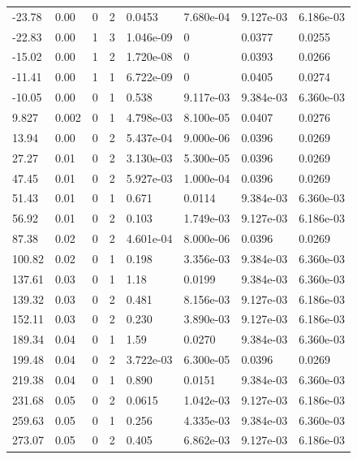 \documentclass[preview]{standalone}
\begin{document}
{{\begin{tabular}{L{1.2cm}C{1.2cm} C{0.3cm}C{0.5cm} C{1.4cm}C{1.4cm} C{1.4cm}C{1.4cm}}
  -23.78  &  0.00  & 0     &  2 &  0.0453  & 7.680e-04  & 9.127e-03 &  6.186e-03   \\ 
  -22.83  &  0.00  & 1     &  3 &  1.046e-09  & 0  & 0.0377 &  0.0255   \\ 
  -15.02  &  0.00  & 1     &  2 &  1.720e-08  & 0  & 0.0393 &  0.0266   \\ 
  -11.41  &  0.00  & 1     &  1 &  6.722e-09  & 0  & 0.0405 &  0.0274   \\ 
  -10.05  &  0.00  & 0     &  1 &  0.538  & 9.117e-03  & 9.384e-03 &  6.360e-03   \\ 
  9.827  &  0.002  & 0     &  1 &  4.798e-03  & 8.100e-05  & 0.0407 &  0.0276   \\ 
  13.94  &  0.00  & 0     &  2 &  5.437e-04  & 9.000e-06  & 0.0396 &  0.0269   \\ 
  27.27  &  0.01  & 0     &  2 &  3.130e-03  & 5.300e-05  & 0.0396 &  0.0269   \\ 
  47.45  &  0.01  & 0     &  2 &  5.927e-03  & 1.000e-04  & 0.0396 &  0.0269   \\ 
  51.43  &  0.01  & 0     &  1 &  0.671  & 0.0114  & 9.384e-03 &  6.360e-03   \\ 
  56.92  &  0.01  & 0     &  2 &  0.103  & 1.749e-03  & 9.127e-03 &  6.186e-03   \\ 
  87.38  &  0.02  & 0     &  2 &  4.601e-04  & 8.000e-06  & 0.0396 &  0.0269   \\ 
  100.82  &  0.02  & 0     &  1 &  0.198  & 3.356e-03  & 9.384e-03 &  6.360e-03   \\ 
  137.61  &  0.03  & 0     &  1 &  1.18  & 0.0199  & 9.384e-03 &  6.360e-03   \\ 
  139.32  &  0.03  & 0     &  2 &  0.481  & 8.156e-03  & 9.127e-03 &  6.186e-03   \\ 
  152.11  &  0.03  & 0     &  2 &  0.230  & 3.890e-03  & 9.127e-03 &  6.186e-03   \\ 
  189.34  &  0.04  & 0     &  1 &  1.59  & 0.0270  & 9.384e-03 &  6.360e-03   \\ 
  199.48  &  0.04  & 0     &  2 &  3.722e-03  & 6.300e-05  & 0.0396 &  0.0269   \\ 
  219.38  &  0.04  & 0     &  1 &  0.890  & 0.0151  & 9.384e-03 &  6.360e-03   \\ 
  231.68  &  0.05  & 0     &  2 &  0.0615  & 1.042e-03  & 9.127e-03 &  6.186e-03   \\ 
  259.63  &  0.05  & 0     &  1 &  0.256  & 4.335e-03  & 9.384e-03 &  6.360e-03   \\ 
  273.07  &  0.05  & 0     &  2 &  0.405  & 6.862e-03  & 9.127e-03 &  6.186e-03   \\ 

\end{tabular}}}
\end{document}

